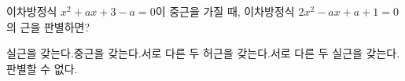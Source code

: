 이차방정식 $x^2+ax+3-a=0$이 중근을 가질 때, 이차방정식 $2x^2-ax+a+1=0$의 근을 판별하면? 
\begin{choicesv}{실근을 갖는다.}{중근을 갖는다.}{서로 다른 두 허근을 갖는다.}{서로 다른 두 실근을 갖는다.}{판별할 수 없다.}\end{choicesv}
